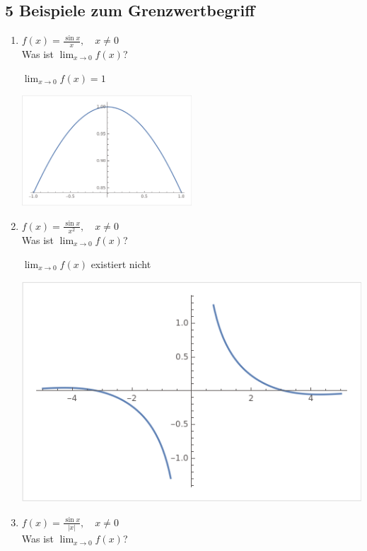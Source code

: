 \documentclass{article}
\theoremstyle{mytheoremstyle}
\theoremstyle{mytheoremstyle}
\theoremstyle{myproblemstyle}
\begin{document}
    \subsection{5 Beispiele zum Grenzwertbegriff}
        \begin{enumerate}
            \item $f(x) = \frac{\sin x}{x}, \quad x \not = 0$ \\ 
            Was ist $\lim_{x \to 0} f(x)$?
            \begin{multicols}{2}
                $\lim_{x \to 0} f(x) = 1$
                
                \columnbreak
            
                \includegraphics[width=0.5\textwidth]{img:5bsp-1.png}
            \end{multicols}
            
            
            \item $f(x) = \frac{\sin x}{x^2}, \quad x \not = 0 $ \\ 
            Was ist $\lim_{x \to 0} f(x)$?
            \begin{multicols}{2}
                
                $\lim_{x \to 0} f(x)$ \color{red} existiert nicht \color{black} 
                \columnbreak

                \includegraphics[width=.5\textwidth]{img:5bsp-2.png}
            \end{multicols}
            
            

            \item $f(x) = \frac{\sin x}{\left|x \right|}, \quad x \not = 0$ \\
            Was ist $\lim_{x \to 0} f(x)$?
            \begin{multicols}{2}
                

\end{multicols}
\end{enumerate}
\end{document}

